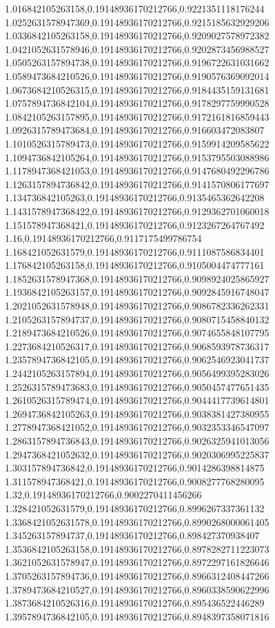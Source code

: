1.016842105263158,0.19148936170212766,0.9221351118176244
1.0252631578947369,0.19148936170212766,0.9215185632929206
1.0336842105263158,0.19148936170212766,0.9209027578972382
1.0421052631578946,0.19148936170212766,0.9202873456988527
1.0505263157894738,0.19148936170212766,0.9196722631031662
1.0589473684210526,0.19148936170212766,0.9190576369092014
1.0673684210526315,0.19148936170212766,0.9184435159131681
1.0757894736842104,0.19148936170212766,0.9178297759990528
1.0842105263157895,0.19148936170212766,0.9172161816859443
1.0926315789473684,0.19148936170212766,0.916603472083807
1.1010526315789473,0.19148936170212766,0.9159914209585622
1.1094736842105264,0.19148936170212766,0.9153795503088986
1.1178947368421053,0.19148936170212766,0.9147680492296786
1.1263157894736842,0.19148936170212766,0.9141570806177697
1.134736842105263,0.19148936170212766,0.9135465362642208
1.1431578947368422,0.19148936170212766,0.9129362701060018
1.151578947368421,0.19148936170212766,0.9123267264767492
1.16,0.19148936170212766,0.9117175499786754
1.168421052631579,0.19148936170212766,0.9111087586834401
1.176842105263158,0.19148936170212766,0.9105004474777161
1.1852631578947368,0.19148936170212766,0.9098924025865927
1.1936842105263157,0.19148936170212766,0.9092845916748047
1.2021052631578948,0.19148936170212766,0.9086782336262331
1.2105263157894737,0.19148936170212766,0.9080715458840132
1.2189473684210526,0.19148936170212766,0.9074655848107795
1.2273684210526317,0.19148936170212766,0.9068593978736317
1.2357894736842105,0.19148936170212766,0.9062546923041737
1.2442105263157894,0.19148936170212766,0.9056499395283026
1.2526315789473683,0.19148936170212766,0.9050457477651435
1.2610526315789474,0.19148936170212766,0.9044417739614801
1.2694736842105263,0.19148936170212766,0.9038381427380955
1.2778947368421052,0.19148936170212766,0.9032353346547097
1.2863157894736843,0.19148936170212766,0.9026325941013056
1.2947368421052632,0.19148936170212766,0.9020306995225837
1.303157894736842,0.19148936170212766,0.9014286398814875
1.311578947368421,0.19148936170212766,0.9008277768280095
1.32,0.19148936170212766,0.9002270411456266
1.328421052631579,0.19148936170212766,0.8996267337361132
1.3368421052631578,0.19148936170212766,0.8990268000061405
1.345263157894737,0.19148936170212766,0.898427370938407
1.3536842105263158,0.19148936170212766,0.8978282711223073
1.3621052631578947,0.19148936170212766,0.8972297161826646
1.3705263157894736,0.19148936170212766,0.8966312408447266
1.3789473684210527,0.19148936170212766,0.8960338590622996
1.3873684210526316,0.19148936170212766,0.895436522446289
1.3957894736842105,0.19148936170212766,0.8948397358071816
